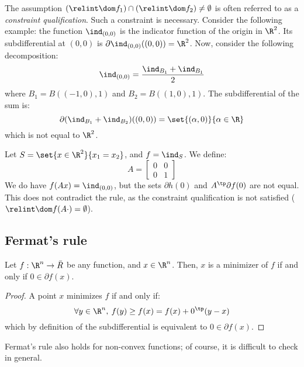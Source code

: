 \begin{remark}
    The assumption $(\relint\dom f_1)\cap (\relint\dom f_2)\neq\emptyset$ is often referred to as a \emph{constraint qualification}. Such a constraint is necessary. Consider the following example: the function $\ind_{(0,0)}$ is the indicator function of the origin in $\R^2$. Its subdifferential at $(0, 0)$ is $\partial\ind_{(0,0)}((0, 0)) = \R^2$. Now, consider the following decomposition:
    \begin{equation*}
        \ind_{(0, 0)} = \frac{\ind_{B_1} + \ind_{B_1}}{2}
    \end{equation*}
    where $B_1 = B((-1, 0), 1)$ and $B_2 = B((1, 0), 1)$. The subdifferential of the sum is:
    \begin{equation*}
        \partial(\ind_{B_1}+\ind_{B_2})((0, 0)) = \set{(\alpha, 0)}{\alpha\in\R}
    \end{equation*}
    which is not equal to $\R^2$.
\end{remark}

\begin{remark}
    Let $S=\set{x\in\R^2}{x_1=x_2}$, and $f=\ind_S$. We define:
    \begin{equation*}
        A = \begin{bmatrix}
            0 & 0\\
            0 & 1
        \end{bmatrix}
    \end{equation*}
    We do have $f(Ax)=\ind_{(0, 0)}$, but the sets $\partial h(0)$ and $A^\tp\partial f(0)$ are not equal. This does not contradict the rule, as the constraint qualification is not satisfied ($\relint\dom f(A\cdot)=\emptyset$).
\end{remark}

\subsection{Fermat's rule}
\begin{theorem}
    Let $f:\R^n\to\bar{R}$ be any function, and $x\in\R^n$. Then, $x$ is a minimizer of $f$ if and only if $0\in\partial f(x)$.
\end{theorem}
\begin{proof}
    A point $x$ minimizes $f$ if and only if:
    \begin{equation*}
        \forall y\in\R^n, \: f(y)\geq f(x) = f(x) + 0^\tp(y-x)
    \end{equation*}
    which by definition of the subdifferential is equivalent to $0\in\partial f(x)$.
\end{proof}
\begin{remark}
    Fermat's rule also holds for non-convex functions; of course, it is difficult to check in general.
\end{remark}